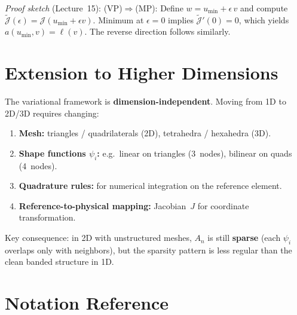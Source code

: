 \documentclass[11pt,a4paper]{article}
\theoremstyle{plain}
\theoremstyle{remark}
\begin{document}
\noindent
\textit{Proof sketch} (Lecture~15):
(VP)$\Rightarrow$(MP): Define $w = u_{\min} + \epsilon\,v$ and compute
$\tilde{\mathcal{J}}(\epsilon) = \mathcal{J}(u_{\min}+\epsilon v)$.
Minimum at $\epsilon = 0$ implies $\tilde{\mathcal{J}}'(0) = 0$,
which yields $a(u_{\min},v) = \ell(v)$.
The reverse direction follows similarly.

\newpage
\section{Extension to Higher Dimensions}
\label{sec:higherdim}

The variational framework is \textbf{dimension-independent}.
Moving from 1D to 2D/3D requires changing:
\begin{enumerate}[nosep]
  \item \textbf{Mesh:} triangles / quadrilaterals (2D),
        tetrahedra / hexahedra (3D).
  \item \textbf{Shape functions $\psi_i$:} e.g.\ linear on triangles
        (3~nodes), bilinear on quads (4~nodes).
  \item \textbf{Quadrature rules:} for numerical integration on the
        reference element.
  \item \textbf{Reference-to-physical mapping:}
        Jacobian~$J$ for coordinate transformation.
\end{enumerate}

Key consequence: in 2D with unstructured meshes, $A_n$ is still
\textbf{sparse} (each $\psi_i$ overlaps only with neighbors), but the
sparsity pattern is less regular than the clean banded structure in 1D.

\newpage
\section{Notation Reference}
\label{sec:notation}
\end{document}
